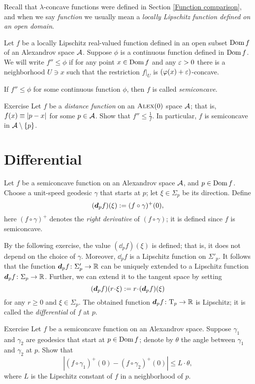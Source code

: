 Recall that $\lambda$-concave functions were defined in Section \ref{Function comparison},
and when we say \textit{function} we usually mean a \textit{locally Lipschitz function defined on an open domain}.

Let $f$ be a locally Lipschitz real-valued function defined in an open subset $\mathop{\rm Dom}\nolimits f$ of an Alexandrov space $\mathcal{A}$.
Suppose $\phi$ is a continuous function defined in $\mathop{\rm Dom}\nolimits f$.
We will write $f''\le \phi$ if for any point $x\in \mathop{\rm Dom}\nolimits f$ and any $\varepsilon>0$ there is a neighborhood $U\ni x$ such that 
the restriction $f|_U$ is $(\varphi(x)+\varepsilon)$-concave.


If $f''\le \phi$ for some continuous function $\phi$, then $f$ is called  \emph{semiconcave}.


\begin{thm}{Exercise}\label{ex:distfun-semiconcave}
Let $f$ be a \emph{distance function} on an $\textsc{Alex}(0)$ space $\mathcal{A}$;
that is, $f(x)\equiv|{p}-{x}|_{}^{{}}$ for some $p\in \mathcal{A}$.
Show that $f''\le \tfrac1f$.
In particular, $f$ is semiconcave in $\mathcal{A}\setminus\{p\}$.
\end{thm}


\section{Differential}\label{sec:differential}

Let $f$ be a semiconcave function on an Alexandrov space $\mathcal{A}$, and $p\in \mathop{\rm Dom}\nolimits f$.
Choose a unit-speed geodesic $\gamma$ that starts at $p$;
let $\xi\in\Sigma_p$ be its direction.
Define 
\[(\bm{d}_pf)(\xi)\mathrel{:=}(f\circ\gamma)^+(0),\]
here $(f\circ\gamma)^+$ denotes the \emph{right derivative} of $(f\circ\gamma)$;
it is defined since $f$ is semiconcave.

By the following exercise, the value $(\dd_pf)(\xi)$ is defined; that is, it does not depend on the choice of $\gamma$.
Moreover, $\dd_pf$ is a Lipschitz function on $\Sigma'_p$.
It follows that the function $\bm{d}_pf\colon\Sigma_p'\to\mathbb{R}$ can be uniquely extended to a Lipschitz function $\bm{d}_pf\colon\Sigma_p\to\mathbb{R}$.
Further, we can extend it to the tangent space by setting 
\[(\dd_pf)(r\cdot \xi)
\df
r\cdot (\dd_pf)(\xi)\]
for any $r\ge 0$ and $\xi\in\Sigma_p$.
The obtained function $\bm{d}_pf\colon\mathrm{T}_p\to\mathbb{R}$ is Lipschitz;
it is called the \emph{differential} of $f$ at $p$.

\begin{thm}{Exercise}\label{ex:df(xi)}
Let $f$ be a semiconcave function on an Alexandrov space.
Suppose $\gamma_1$ and $\gamma_2$ are geodesics that start at $p\in \mathop{\rm Dom}\nolimits f$;
denote by $\theta$ the angle between $\gamma_1$ and $\gamma_2$ at $p$.
Show that 
\[|(f\circ\gamma_1)^+(0)-(f\circ\gamma_2)^+(0)|\le L\cdot \theta,\]
where $L$ is the Lipschitz constant of $f$ in a neighborhood of $p$.
\end{thm}

